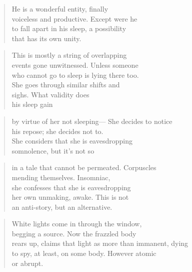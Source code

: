 \documentclass[
]{memoir}
\newlength{\drop}%
\begin{document}
\begin{verse}
He is a wonderful entity, finally\\
voiceless and productive. Except were he\\
to fall apart in his sleep, a possibility\\
that has its own unity.\\
\end{verse}

\begin{verse}
This is mostly a string of overlapping\\
events gone unwitnessed. Unless someone\\
who cannot go to sleep is lying there too.\\
She goes through similar shifts and\\
sighs. What validity does\\
his sleep gain\\
\end{verse}

\begin{verse}
by virtue of her not sleeping— She decides to notice\\
his repose; she decides not to.\\
She considers that she is eavesdropping\\
somnolence, but it’s not so\\
\end{verse}

\begin{verse}
in a tale that cannot be permeated. Corpuscles\\
mending themselves. Insomniac,\\
she confesses that she is eavesdropping\\
her own unmaking, awake. This is not\\
an anti-story, but an alternative.\\
\end{verse}

\begin{verse}
White lights come in through the window,\\
begging a source. Now the frazzled body\\
rears up, claims that light as more than immanent, dying\\
to spy, at least, on some body. However atomic\\
or abrupt.\\
\end{verse}
\end{document}
